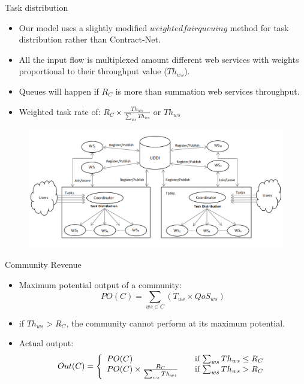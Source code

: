 \documentclass{beamer}
\begin{document}
\begin{frame}{Task distribution}
    \begin{itemize}
        \item Our model uses a slightly modified $weighted fair queuing$ method for task distribution rather than Contract-Net.
        \item All the input flow is multiplexed amount different web services with weights proportional to their throughput value ($Th_{ws}$).
        \item Queues will happen if $R_C$ is more than summation web services throughput.
        \item Weighted task rate of: $R_C \times \frac{Th_{ws}}{\sum_{ws}{Th_{ws}}}$ or $Th_{ws}$
    \end{itemize}
    \begin{figure}[htbp]
        \centering
        \includegraphics[width=0.8 \columnwidth]{figures/community.png}
    \end{figure}
\end{frame}

\begin{frame}{Community Revenue}
    \begin{itemize}
        \item Maximum potential output of a community:
            \begin{equation*}
                PO(C) = \sum_{ws \in C}{(T_{ws} \times QoS_{ws})}
            \end{equation*}
        \item if $Th_{ws} > R_C$, the community cannot perform at its maximum potential.
        \item Actual output:
            \begin{equation}\label{out_c}
                Out(C) = \left\{
                  \begin{array}{l l}
                    PO(C) & \quad \text{if $\sum_{ws}{Th_{ws}} \leq R_{C}$}\\
                    PO(C) \times \frac{R_{C}}{\sum_{ws}{Th_{ws}}} & \quad \text{if $\sum_{ws}{Th_{ws}} > R_{C}$}
                  \end{array} \right.
            \end{equation}
    \end{itemize}
\end{frame}
\end{document}
